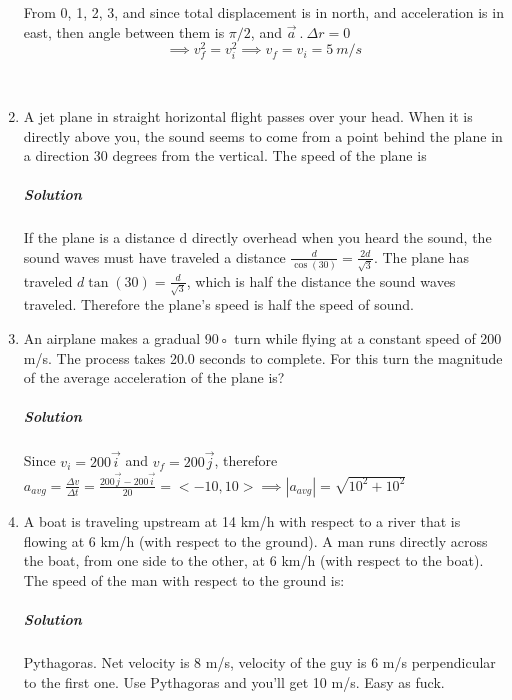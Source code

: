 \documentclass{article}
\begin{document}
\begin{enumerate}[1.]
		From 0, 1, 2, 3, and since total displacement is in north, and acceleration is in east, then angle between them is $ \pi /2 $, and $ \vec{ a }\ .\ \varDelta r = 0 $
		\[
			\implies v_f^2 = v_i^2 \implies v_f = v_i = 5\ m / s
		\]

		\
	
\item  A jet plane in straight horizontal flight passes over your head. When it is directly above you, the sound seems to come from a point behind the plane in a direction 30 degrees from the vertical.
The speed of the plane is
\subparagraph{Solution}
		If the plane is a distance d directly overhead when you heard the sound, the sound waves must have traveled a distance $\frac{d}{\cos(30)} = \frac{2d}{ \sqrt{ 3 } } $.  The plane has traveled $d\tan(30) = \frac{d}{\sqrt{3}}$, which is half the distance the sound waves traveled.  Therefore the plane's speed is half the speed of sound.

\item An airplane makes a gradual 90◦ turn while flying at a constant speed of 200 m/s. The process takes 20.0 seconds to complete. For this turn the magnitude of the average acceleration of the plane is?
	\subparagraph{Solution}
		Since $ v_i=200 \vec{ i } $ and $ v_f = 200 \vec{ j } $, therefore $ a_{avg}= \frac{ \varDelta v }{ \varDelta t } = \frac{ 200 \vec{ j }- 200 \vec{ i } }{ 20 } = <-10,10> \implies |a_{avg}| = \sqrt{ 10^2 + 10^2 } $  

\item A boat is traveling upstream at 14 km/h with respect to a river that is flowing at 6 km/h (with
respect to the ground). A man runs directly across the boat, from one side to the other, at
6 km/h (with respect to the boat). The speed of the man with respect to the ground is:
\subparagraph{Solution}
Pythagoras. Net velocity is  8 m/s, velocity of the guy is 6 m/s perpendicular to the first one. Use Pythagoras and you'll get 10 m/s. Easy as fuck.

\end{enumerate}
\end{document}

